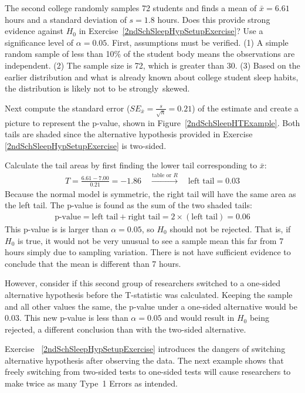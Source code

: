 \begin{example}{The second college randomly samples 72 students and finds a mean of $\bar{x} = 6.61$ hours and a standard deviation of $s=1.8$ hours. Does this provide strong evidence against $H_0$ in Exercise~\ref{2ndSchSleepHypSetupExercise}? Use a significance level of $\alpha=0.05$.}
First, assumptions must be verified. (1) A simple random sample of less than 10\% of the student body means the observations are independent. (2) The sample size is 72, which is greater than 30. (3) Based on the earlier distribution and what is already known about college student sleep habits, the distribution is likely not to be strongly~skewed.

Next compute the standard error ($SE_{\bar{x}} = \frac{s}{\sqrt{n}} = 0.21$) of the estimate and create a picture to represent the p-value, shown in Figure~\ref{2ndSchSleepHTExample}. Both tails are shaded since the alternative hypothesis provided in Exercise \ref{2ndSchSleepHypSetupExercise} is two-sided.

Calculate the tail areas by first finding the lower tail corresponding to $\bar{x}$:
\begin{eqnarray*}
T = \frac{6.61 - 7.00}{0.21} = -1.86 \quad\stackrel{\text{table or $R$}}{\rightarrow}\quad \text{left tail}=0.03
\end{eqnarray*}
Because the normal model is symmetric, the right tail will have the same area as the left tail. The p-value is found as the sum of the two shaded tails:
\begin{eqnarray*}
\text{p-value} = \text{left tail} + \text{right tail} = 2\times(\text{left tail}) = 0.06
\end{eqnarray*}
This p-value is is larger than $\alpha=0.05$, so $H_0$ should not be rejected. That is, if $H_0$ is true, it would not be very unusual to see a sample mean this far from 7 hours simply due to sampling variation. There is not have sufficient evidence to conclude that the mean is different than 7 hours.

However, consider if this second group of researchers switched to a one-sided alternative hypothesis before the T-statistic was calculated. Keeping the sample and all other values the same, the p-value under a one-sided alternative would be 0.03. This new p-value is less than $\alpha = 0.05$ and would result in $H_0$ being rejected, a different conclusion than with the two-sided alternative. 
\end{example}

Exercise ~\ref{2ndSchSleepHypSetupExercise} introduces the dangers of switching alternative hypothesis after observing the data. The next example shows that freely switching from two-sided tests to one-sided tests will cause researchers to make twice as many Type~1 Errors as intended.

